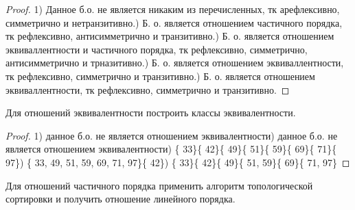 \begin{proof}
	1) Данное б.о. не является никаким из перечисленных, тк арефлексивно, симметрично и нетранзитивно.) Б. о. является отношением частичного порядка, тк рефлексивно, антисимметрично и транзитивно.) Б. о. является отношением эквиваллентности и частичного порядка, тк рефлексивно, симметрично, антисимметрично и трназитивно.) Б. о. является отношением эквиваллентности, тк рефлексивно, симметрично и транзитивно.) Б. о. является отношением эквиваллентности, тк рефлексивно, симметрично и транзитивно.\newline
\end{proof}
\begin{problem}
	Для отношений эквивалентности построить классы эквивалентности.
\end{problem}

\begin{proof}
   1) данное б.о. не является отношением эквивалентности) данное б.о. не является отношением эквивалентности) \{ 33\}\{ 42\}\{ 49\}\{ 51\}\{ 59\}\{ 69\}\{ 71\}\{ 97\}) \{ 33, 49, 51, 59, 69, 71, 97\}\{ 42\}) \{ 33\}\{ 42\}\{ 49\}\{ 51, 59\}\{ 69\}\{ 71, 97\}\newline
\end{proof}
\begin{problem}
	Для отношений частичного порядка применить алгоритм топологической сортировки и получить отношение линейного порядка.
\end{problem}

